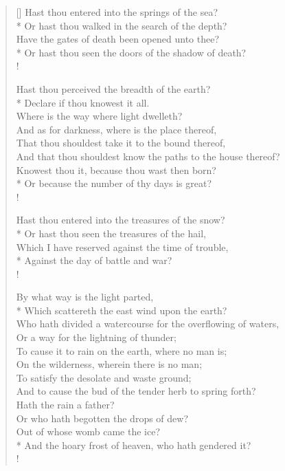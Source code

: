 \documentclass[MAIN]{subfiles}
\begin{document}
\begin{verse}[\versewidth]
Hast thou entered into the springs of the sea?\\*
\vin Or hast thou walked in the search of the depth?\\
Have the gates of death been opened unto thee?\\*
\vin Or hast thou seen the doors of the shadow of death?\\!

Hast thou perceived the breadth of the earth?\\*
\vin Declare if thou knowest it all.\\
Where is the way where light dwelleth?\\
\vin And as for darkness, where is the place thereof,\\
That thou shouldest take it to the bound thereof,\\
\vin And that thou shouldest know the paths to the house thereof?\\
Knowest thou it, because thou wast then born?\\*
\vin Or because the number of thy days is great?\\!

Hast thou entered into the treasures of the snow?\\*
\vin Or hast thou seen the treasures of the hail,\\
Which I have reserved against the time of trouble,\\*
\vin Against the day of battle and war?\\!

By what way is the light parted,\\*
\vin Which scattereth the east wind upon the earth?\\
Who hath divided a watercourse for the overflowing of waters,\\
\vin Or a way for the lightning of thunder;\\
To cause it to rain on the earth, where no man is;\\
\vin On the wilderness, wherein there is no man;\\
To satisfy the desolate and waste ground;\\
\vin And to cause the bud of the tender herb to spring forth?\\
Hath the rain a father?\\
\vin Or who hath begotten the drops of dew?\\
Out of whose womb came the ice?\\*
\vin And the hoary frost of heaven, who hath gendered it?\\!


\end{verse}
\end{document}
